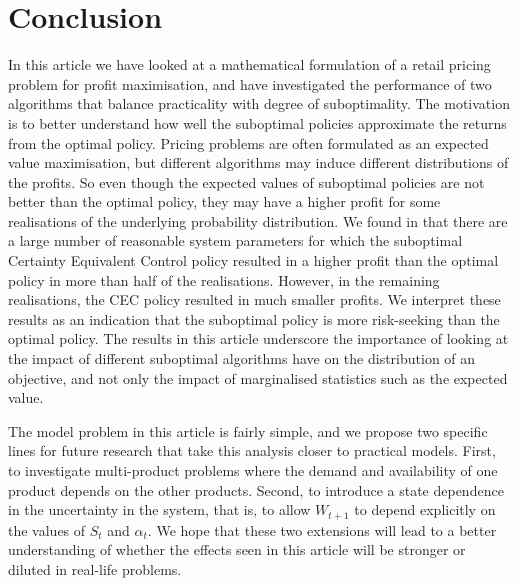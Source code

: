 \documentclass[main.tex]{subfiles}
\begin{document}
\listoftodos

\section{Conclusion}\label{sec:conclusion}
In this article we have looked at a mathematical formulation of a
retail pricing problem for profit maximisation, and have investigated the
performance of two algorithms that balance practicality
with degree of suboptimality. The motivation is to better understand
how well the suboptimal policies approximate the returns from the
optimal policy.
Pricing problems are often formulated as an expected value
maximisation, but different algorithms may induce different
distributions of the profits.
So even though the expected values of suboptimal policies are not better
than the optimal policy, they may have a higher profit for some
realisations of the underlying probability distribution.
We found in  that there are a
large number of
reasonable system parameters for which
the suboptimal Certainty Equivalent Control policy resulted in a higher profit
than the optimal policy in more than half of the realisations.
However, in the remaining realisations, the CEC policy resulted in
much smaller profits. We interpret these results as an indication that
the suboptimal policy is more risk-seeking than the optimal policy.
The results in this article underscore the importance of looking at
the impact of
different suboptimal algorithms have on the distribution of
an objective, and not only the impact of
marginalised statistics such as the expected value.

The model problem in this article is fairly simple, and
we propose two specific lines for future research that
take this analysis closer to practical models.
First, to investigate multi-product problems where the demand and
availability of one product depends on the other products.
Second, to introduce a state dependence in the uncertainty in the
system, that is, to allow $W_{t+1}$ to depend explicitly on the values
of $S_t$ and $\alpha_t$.
We hope that these two extensions will lead to a better understanding of
whether the effects seen in this article will be stronger or diluted
in real-life problems.

\biblio
\end{document}
